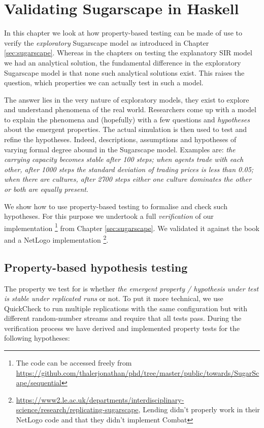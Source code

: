 \chapter{Validating Sugarscape in Haskell}
\label{app:validating_sugarscape}

In this chapter we look at how property-based testing can be made of use to verify the \textit{exploratory} Sugarscape model \cite{epstein_growing_1996} as introduced in Chapter \ref{sec:sugarscape}. Whereas in the chapters on testing the explanatory SIR model we had an analytical solution, the fundamental difference in the exploratory Sugarscape model is that none such analytical solutions exist. This raises the question, which properties we can actually test in such a model.

The answer lies in the very nature of exploratory models, they exist to explore and understand phenomena of the real world. Researchers come up with a model to explain the phenomena and (hopefully) with a few questions and \textit{hypotheses} about the emergent properties. The actual simulation is then used to test and refine the hypotheses. Indeed, descriptions, assumptions and hypotheses of varying formal degree abound in the Sugarscape model. Examples are: \textit{the carrying capacity becomes stable after 100 steps; when agents trade with each other, after 1000 steps the standard deviation of trading prices is less than 0.05; when there are cultures, after 2700 steps either one culture dominates the other or both are equally present}. 

We show how to use property-based testing to formalise and check such hypotheses. For this purpose we undertook a full \textit{verification} of our implementation \footnote{The code can be accessed freely from \url{https://github.com/thalerjonathan/phd/tree/master/public/towards/SugarScape/sequential}} from Chapter \ref{sec:sugarscape}. We validated it against the book \cite{epstein_growing_1996} and a NetLogo implementation \cite{weaver_replicating_2009} \footnote{\url{https://www2.le.ac.uk/departments/interdisciplinary-science/research/replicating-sugarscape}, Lending didn't properly work in their NetLogo code and that they didn't implement Combat}. 

\section{Property-based hypothesis testing}
The property we test for is whether \textit{the emergent property / hypothesis under test is stable under replicated runs} or not. To put it more technical, we use QuickCheck to run multiple replications with the same configuration but with different random-number streams and require that all tests pass. During the verification process we have derived and implemented property tests for the following hypotheses:

